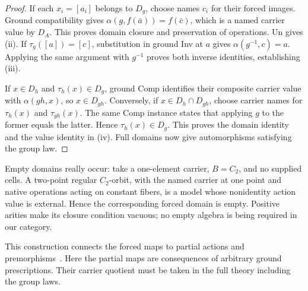 \begin{proof}
If each $x_i=[a_i]$ belongs to $D_g$, choose names $c_i$ for their forced
images. Ground compatibility gives
$\alpha(g,f(\bar a))=f(\bar c)$, which is a named carrier value by $D_A$.
This proves domain closure and preservation of operations. Un gives (ii).
If $\tau_g([a])=[c]$, substitution in ground Inv at $a$ gives
$\alpha(g^{-1},c)=a$. Applying the same argument with $g^{-1}$ proves both
inverse identities, establishing (iii).

If $x\in D_h$ and $\tau_h(x)\in D_g$, ground Comp identifies their
composite carrier value with $\alpha(gh,x)$, so $x\in D_{gh}$.
Conversely, if $x\in D_h\cap D_{gh}$, choose carrier names for
$\tau_h(x)$ and $\tau_{gh}(x)$. The same Comp instance states that applying
$g$ to the former equals the latter. Hence $\tau_h(x)\in D_g$.
This proves the domain identity and the value identity in (iv).
Full domains now give automorphisms satisfying the group law.
\end{proof}

Empty domains really occur: take a one-element carrier, $B=C_2$, and no
supplied cells. A two-point regular $C_2$-orbit, with the named carrier at
one point and native operations acting on constant fibers, is a model
whose nonidentity action value is external. Hence the corresponding
forced domain is empty. Positive arities make its closure condition
vacuous; no empty algebra is being required in our category.

This construction connects the forced maps to partial actions and
premorphisms~\cite{Hollings2007,KhrypchenkoNovikov2018}. Here the partial
maps are consequences of arbitrary ground prescriptions. Their carrier
quotient must be taken in the full theory including the group laws.
